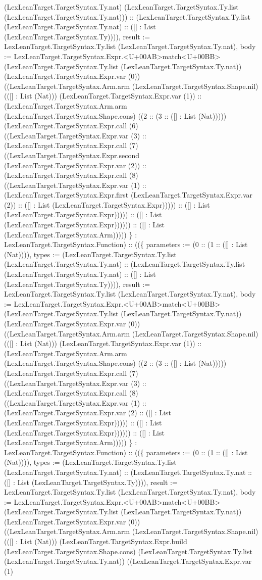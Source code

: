 \documentclass[11pt]{article}
\begin{document}
(LexLeanTarget.TargetSyntax.Ty.nat) (LexLeanTarget.TargetSyntax.Ty.list (LexLeanTarget.TargetSyntax.Ty.nat))) :: (LexLeanTarget.TargetSyntax.Ty.list (LexLeanTarget.TargetSyntax.Ty.nat) :: ([] : List (LexLeanTarget.TargetSyntax.Ty)))), result := LexLeanTarget.TargetSyntax.Ty.list (LexLeanTarget.TargetSyntax.Ty.nat), body := LexLeanTarget.TargetSyntax.Expr.<U+00AB>match<U+00BB> (LexLeanTarget.TargetSyntax.Ty.list (LexLeanTarget.TargetSyntax.Ty.nat)) (LexLeanTarget.TargetSyntax.Expr.var (0)) ((LexLeanTarget.TargetSyntax.Arm.arm (LexLeanTarget.TargetSyntax.Shape.nil) (([] : List (Nat))) (LexLeanTarget.TargetSyntax.Expr.var (1)) :: (LexLeanTarget.TargetSyntax.Arm.arm (LexLeanTarget.TargetSyntax.Shape.cons) ((2 :: (3 :: ([] : List (Nat))))) (LexLeanTarget.TargetSyntax.Expr.call (6) ((LexLeanTarget.TargetSyntax.Expr.var (3) :: (LexLeanTarget.TargetSyntax.Expr.call (7) ((LexLeanTarget.TargetSyntax.Expr.second (LexLeanTarget.TargetSyntax.Expr.var (2)) :: (LexLeanTarget.TargetSyntax.Expr.call (8) ((LexLeanTarget.TargetSyntax.Expr.var (1) :: (LexLeanTarget.TargetSyntax.Expr.first (LexLeanTarget.TargetSyntax.Expr.var (2)) :: ([] : List (LexLeanTarget.TargetSyntax.Expr))))) :: ([] : List (LexLeanTarget.TargetSyntax.Expr))))) :: ([] : List (LexLeanTarget.TargetSyntax.Expr)))))) :: ([] : List (LexLeanTarget.TargetSyntax.Arm))))) \} : LexLeanTarget.TargetSyntax.Function) :: ((\{ parameters := (0 :: (1 :: ([] : List (Nat)))), types := (LexLeanTarget.TargetSyntax.Ty.list (LexLeanTarget.TargetSyntax.Ty.nat) :: (LexLeanTarget.TargetSyntax.Ty.list (LexLeanTarget.TargetSyntax.Ty.nat) :: ([] : List (LexLeanTarget.TargetSyntax.Ty)))), result := LexLeanTarget.TargetSyntax.Ty.list (LexLeanTarget.TargetSyntax.Ty.nat), body := LexLeanTarget.TargetSyntax.Expr.<U+00AB>match<U+00BB> (LexLeanTarget.TargetSyntax.Ty.list (LexLeanTarget.TargetSyntax.Ty.nat)) (LexLeanTarget.TargetSyntax.Expr.var (0)) ((LexLeanTarget.TargetSyntax.Arm.arm (LexLeanTarget.TargetSyntax.Shape.nil) (([] : List (Nat))) (LexLeanTarget.TargetSyntax.Expr.var (1)) :: (LexLeanTarget.TargetSyntax.Arm.arm (LexLeanTarget.TargetSyntax.Shape.cons) ((2 :: (3 :: ([] : List (Nat))))) (LexLeanTarget.TargetSyntax.Expr.call (7) ((LexLeanTarget.TargetSyntax.Expr.var (3) :: (LexLeanTarget.TargetSyntax.Expr.call (8) ((LexLeanTarget.TargetSyntax.Expr.var (1) :: (LexLeanTarget.TargetSyntax.Expr.var (2) :: ([] : List (LexLeanTarget.TargetSyntax.Expr))))) :: ([] : List (LexLeanTarget.TargetSyntax.Expr)))))) :: ([] : List (LexLeanTarget.TargetSyntax.Arm))))) \} : LexLeanTarget.TargetSyntax.Function) :: ((\{ parameters := (0 :: (1 :: ([] : List (Nat)))), types := (LexLeanTarget.TargetSyntax.Ty.list (LexLeanTarget.TargetSyntax.Ty.nat) :: (LexLeanTarget.TargetSyntax.Ty.nat :: ([] : List (LexLeanTarget.TargetSyntax.Ty)))), result := LexLeanTarget.TargetSyntax.Ty.list (LexLeanTarget.TargetSyntax.Ty.nat), body := LexLeanTarget.TargetSyntax.Expr.<U+00AB>match<U+00BB> (LexLeanTarget.TargetSyntax.Ty.list (LexLeanTarget.TargetSyntax.Ty.nat)) (LexLeanTarget.TargetSyntax.Expr.var (0)) ((LexLeanTarget.TargetSyntax.Arm.arm (LexLeanTarget.TargetSyntax.Shape.nil) (([] : List (Nat))) (LexLeanTarget.TargetSyntax.Expr.build (LexLeanTarget.TargetSyntax.Shape.cons) (LexLeanTarget.TargetSyntax.Ty.list (LexLeanTarget.TargetSyntax.Ty.nat)) ((LexLeanTarget.TargetSyntax.Expr.var (1) 
\end{document}

